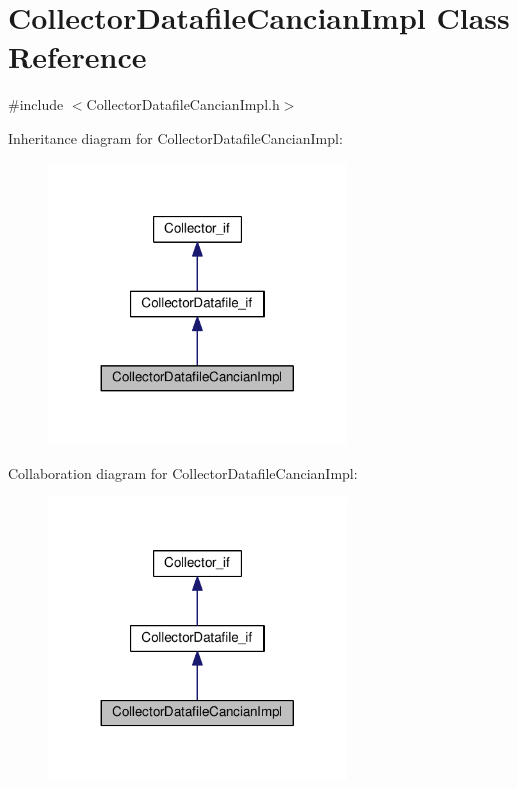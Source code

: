 \hypertarget{class_collector_datafile_cancian_impl}{\section{Collector\-Datafile\-Cancian\-Impl Class Reference}
\label{class_collector_datafile_cancian_impl}
}


{\ttfamily \#include $<$Collector\-Datafile\-Cancian\-Impl.\-h$>$}



Inheritance diagram for Collector\-Datafile\-Cancian\-Impl\-:
\nopagebreak
\begin{figure}[H]
\begin{center}
\leavevmode
\includegraphics[width=224pt]{class_collector_datafile_cancian_impl__inherit__graph}
\end{center}
\end{figure}


Collaboration diagram for Collector\-Datafile\-Cancian\-Impl\-:
\nopagebreak
\begin{figure}[H]
\begin{center}
\leavevmode
\includegraphics[width=224pt]{class_collector_datafile_cancian_impl__coll__graph}
\end{center}
\end{figure}
